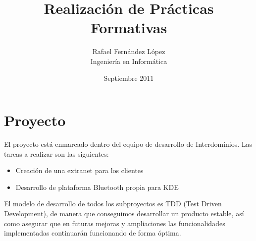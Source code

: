 \documentclass[12pt]{article}
\title{Realización de Prácticas Formativas}
\author{Rafael Fernández López\\Ingeniería en Informática}
\date{Septiembre 2011}
\begin{document}
  \maketitle
  \section{Proyecto}
    El proyecto está enmarcado dentro del equipo de desarrollo de Interdominios. Las tareas a
    realizar son las siguientes:
    \begin{itemize}
      \item Creación de una extranet para los clientes
      \item Desarrollo de plataforma Bluetooth propia para KDE
    \end{itemize}
    El modelo de desarrollo de todos los subproyectos es TDD (Test Driven Development), de manera
    que conseguimos desarrollar un producto estable, así como asegurar que en futuras mejoras y
    ampliaciones las funcionalidades implementadas continuarán funcionando de forma óptima.
\end{document}
